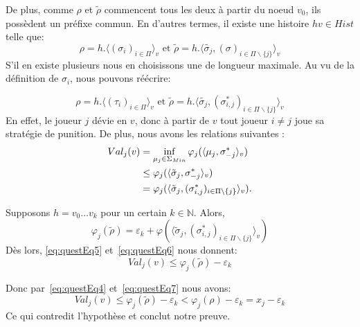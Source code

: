\begin{demonstration}
\begin{itemize}
		De plus, comme $\rho$ et $\tilde{\rho}$ commencent tous les deux à partir du noeud $v_0$, ils possèdent un préfixe commun. En d'autres termes, il existe une histoire $hv \in Hist$ telle que: 
		\begin{equation*}
			\rho = h. \langle (\sigma_i)_{i\in\Pi} \rangle_v \text{ et } \tilde{\rho} =  h.\langle \tilde{\sigma_j}, (\sigma)_{i\in\Pi\backslash \{ j \}} \rangle_v
		\end{equation*}
		 S'il en existe plusieurs nous en choisissons une de longueur maximale.
		Au vu de la définition de $\sigma_i$, nous pouvons réécrire:
		
		\begin{equation*}
			\rho = h. \langle (\tau_i)_{i\in\Pi} \rangle_v \text{ et } \tilde{\rho} = h.\langle \tilde{\sigma_j}, (\sigma^*_{i,j})_{i\in\Pi \backslash\{ j \} }\rangle_v
		\end{equation*}
		En effet, le joueur $j$ dévie en $v$, donc à partir de $v$ tout joueur $i \neq j$ joue sa stratégie de punition. De plus, nous avons les relations suivantes : 
		\begin{align}
			Val_j(v) &= \inf_{\mu_j\in\Sigma_{Min}}\varphi_j(\langle \mu_j, \sigma^*_{-j}\rangle_v)\notag\\
					 &\leq \varphi_j(\langle \tilde{\sigma}_j, \sigma^*_{-j}\rangle_v)\notag\\
					& = \varphi_j(\langle \tilde{\sigma}_j, (\sigma^*_{i,j})_{i \in \Pi \backslash \{ j \}}\rangle_v). \label{eq:questEq5}
		\end{align}
		
	Supposons $h = v_0 \ldots v_k$ pour un certain $k \in \mathbb{N}$. Alors,
	\begin{equation}
		\label{eq:questEq6}
		\varphi_j(\tilde{\rho}) = \varepsilon_k + \varphi(\langle \tilde{\sigma}_j , (\sigma^*_{i,j})_{i\in\Pi\backslash\{ j \}}\rangle_v)
	\end{equation}
	Dès lors, \eqref{eq:questEq5} et~\eqref{eq:questEq6} nous donnent:
	\begin{equation}
		\label{eq:questEq7}
		Val_j(v) \leq \varphi_j(\tilde{\rho}) - \varepsilon_k
	\end{equation}
	
	Donc par~\eqref{eq:questEq4} et~\eqref{eq:questEq7}  nous avons:
	$$ Val_j(v) \leq \varphi_j(\tilde{\rho})- \varepsilon_k < \varphi_j(\rho)-\varepsilon_k = x_j-\varepsilon_k$$
	Ce qui contredit l'hypothèse et conclut notre preuve.
	\end{itemize}
\end{demonstration}


